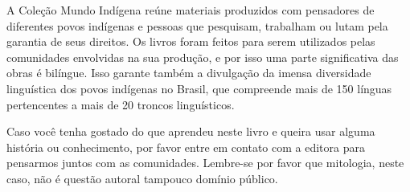 A Coleção Mundo Indígena reúne materiais produzidos com pensadores de
diferentes povos indígenas e pessoas que pesquisam, trabalham
ou lutam pela garantia de seus direitos. Os livros
foram feitos para serem utilizados pelas comunidades envolvidas na sua
produção, e por isso uma parte significativa das obras é bilíngue. 
Isso garante também a divulgação da imensa diversidade linguística dos povos
indígenas no Brasil, que compreende mais de 150 línguas pertencentes a mais de
20 troncos linguísticos.

Caso você tenha gostado do que aprendeu neste livro e queira usar alguma
história ou conhecimento, por favor entre em contato com a editora 
para pensarmos juntos com as comunidades. Lembre-se por favor
que mitologia, neste caso, não é questão autoral tampouco domínio público.\par
